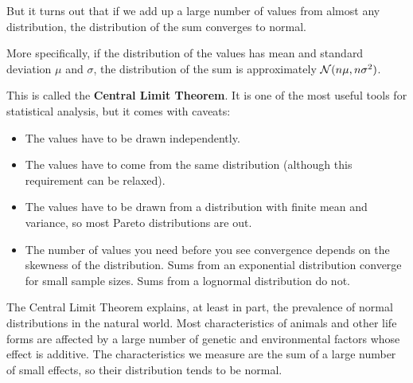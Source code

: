 \documentclass[12pt]{book}
\begin{document}
But it turns out that if we add up a large number of values from
almost any distribution, the distribution of the sum converges to
normal.

More specifically, if the distribution of the values has mean and
standard deviation $\mu$ and $\sigma$, the distribution of the sum is
approximately $\mathcal{N}(n \mu, n \sigma^2)$.

This is called the {\bf Central Limit Theorem}.  It is one of the
most useful tools for statistical analysis, but it comes with
caveats:

\begin{itemize}

\item The values have to be drawn independently.


\item The values have to come from the same distribution (although
  this requirement can be relaxed).


\item The values have to be drawn
  from a distribution with finite mean and variance, so most Pareto
  distributions are out.



\item The number of values you need before you see convergence depends
  on the skewness of the distribution.  Sums from an exponential
  distribution converge for small sample sizes.  Sums from a
  lognormal distribution do not.


\end{itemize}


The Central Limit Theorem explains, at least in part, the prevalence
of normal distributions in the natural world.  Most characteristics of
animals and other life forms are affected by a large number of genetic
and environmental factors whose effect is additive.  The characteristics
we measure are the sum of a large number of small effects, so their
distribution tends to be normal.
\end{document}
